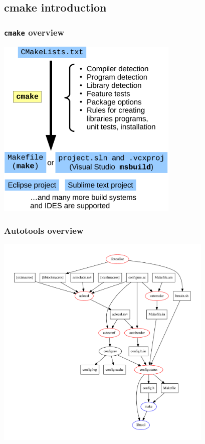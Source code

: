 \documentclass{beamer}
\newcommand{\cmd}[1]{\textbf{\texttt{#1}}}
\begin{document}
\subsection{cmake introduction}

\begin{frame}
  \frametitle{\cmd{cmake} overview}
  \medskip
  \centering
  \includegraphics[width=0.65\textwidth]{cmake-flow}
\end{frame}

\begin{frame}
  \frametitle{Autotools overview}
  \centering
  \includegraphics[width=0.78\textwidth]{autotools}
\end{frame}
\end{document}
